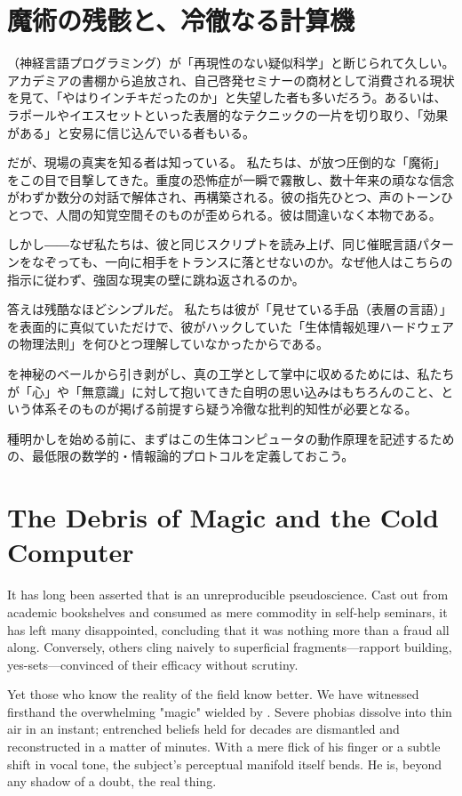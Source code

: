 \ifja
    \chapter{魔術の残骸と、冷徹なる計算機}
    \abbrNLP （神経言語プログラミング）が「再現性のない疑似科学」と断じられて久しい。アカデミアの書棚から追放され、自己啓発セミナーの商材として消費される現状を見て、「やはりインチキだったのか」と失望した者も多いだろう。あるいは、ラポールやイエスセットといった表層的なテクニックの一片を切り取り、「効果がある」と安易に信じ込んでいる者もいる。

    だが、現場の真実を知る者は知っている。
    私たちは、\jaDrBandler が放つ圧倒的な「魔術」をこの目で目撃してきた。重度の恐怖症が一瞬で霧散し、数十年来の頑なな信念がわずか数分の対話で解体され、再構築される。彼の指先ひとつ、声のトーンひとつで、人間の知覚空間そのものが歪められる。彼は間違いなく本物である。

    しかし――なぜ私たちは、彼と同じスクリプトを読み上げ、同じ催眠言語パターンをなぞっても、一向に相手をトランスに落とせないのか。なぜ他人はこちらの指示に従わず、強固な現実の壁に跳ね返されるのか。

    答えは残酷なほどシンプルだ。
    私たちは彼が「見せている手品（表層の言語）」を表面的に真似ていただけで、彼がハックしていた「生体情報処理ハードウェアの物理法則」を何ひとつ理解していなかったからである。

    \abbrNLP を神秘のベールから引き剥がし、真の工学として掌中に収めるためには、私たちが「心」や「無意識」に対して抱いてきた自明の思い込みはもちろんのこと、\abbrNLP という体系そのものが掲げる前提すら疑う冷徹な批判的知性が必要となる。

    種明かしを始める前に、まずはこの生体コンピュータの動作原理を記述するための、最低限の数学的・情報論的プロトコルを定義しておこう。
\else

    \chapter{The Debris of Magic and the Cold Computer}

    It has long been asserted that \abbrNLP is an unreproducible pseudoscience. Cast out from academic bookshelves and consumed as mere commodity in self-help seminars, it has left many disappointed, concluding that it was nothing more than a fraud all along. Conversely, others cling naively to superficial fragments—rapport building, yes-sets—convinced of their efficacy without scrutiny.

    Yet those who know the reality of the field know better.
    We have witnessed firsthand the overwhelming "magic" wielded by \fullDrBandler. Severe phobias dissolve into thin air in an instant; entrenched beliefs held for decades are dismantled and reconstructed in a matter of minutes. With a mere flick of his finger or a subtle shift in vocal tone, the subject's perceptual manifold itself bends. He is, beyond any shadow of a doubt, the real thing.

